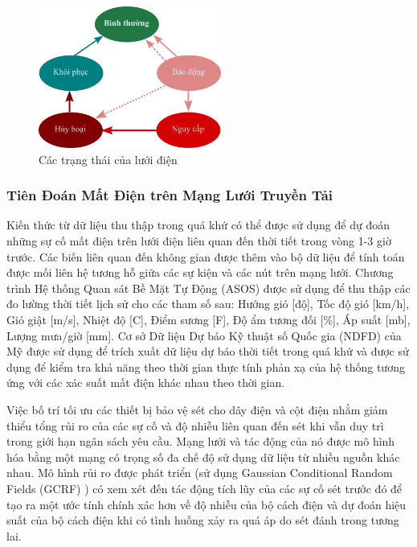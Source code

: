 \documentclass[utf8]{frontiersSCNS} %
\begin{document}
\FloatBarrier
\begin{figure}[h]
	\centering
	\begin{center}
		\includegraphics[width=6cm]{electricgridstates}%
	\end{center}
	\caption{Các trạng thái của lưới điện}\label{fig:grid}
\end{figure}
\FloatBarrier

\subsubsection{Tiên Đoán Mất Điện trên Mạng Lưới Truyền Tải}
Kiến thức từ dữ liệu thu thập trong quá khứ có thể được sử dụng để dự đoán những sự cố mất điện trên lưới điện liên quan đến thời tiết trong vòng 1-3 giờ trước. Các biến liên quan đến không gian được thêm vào bộ dữ liệu để tính toán được mối liên hệ tương hỗ giữa các sự kiện và các nút trên mạng lưới. Chương trình Hệ thống Quan sát Bề Mặt Tự Động (ASOS) được sử dụng để thu thập các đo lường thời tiết lịch sử cho các tham số sau: Hướng gió [độ], Tốc độ gió [km/h], Gió giật [m/s], Nhiệt độ [C], Điểm sương [F], Độ ẩm tương đối [\%], Áp suất [mb], Lượng mưa/giờ [mm]. Cơ sở Dữ liệu Dự báo Kỹ thuật số Quốc gia (NDFD) của Mỹ được sử dụng để trích xuất dữ liệu dự báo thời tiết trong quá khứ và được sử dụng để kiểm tra khả năng theo thời gian thực tính phản xạ của hệ thống tương ứng với các xác suất mất điện khác nhau theo thời gian.

Việc bố trí tối ưu các thiết bị bảo vệ sét cho dây điện và cột điện nhằm giảm thiểu tổng rủi ro của các sự cố và độ nhiễu liên quan đến sét khi vẫn duy trì trong giới hạn ngân sách yêu cầu. Mạng lưới và tác động của nó được mô hình hóa bằng một mạng có trọng số đa chế độ sử dụng dữ liệu từ nhiều nguồn khác nhau. Mô hình rủi ro được phát triển (sử dụng Gaussian Conditional Random Fields (GCRF) \citep{Radosavljevic2013}) có xem xét đến tác động tích lũy của các sự cố sét trước đó để tạo ra một ước tính chính xác hơn về độ nhiễu của bộ cách điện và dự đoán hiệu suất của bộ cách điện khi có tình huống xảy ra quá áp do sét đánh trong tương lai. %
\end{document}

